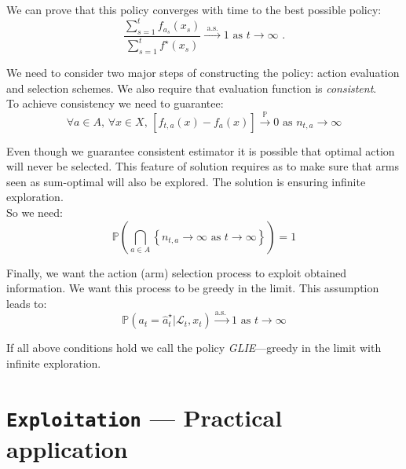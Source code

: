 \documentclass[12pt, a4paper, pdflatex, leqno]{report}
\begin{document}
We can prove that this policy converges with time to the best possible policy:
\begin{equation}
  \frac
    {\sum_{s=1}^t f_{a_s} (x_s)}
    {\sum_{s=1}^t f^\star (x_s)}
  \xrightarrow{\text{ a.s.\ }} 1 \text{ as } t \rightarrow \infty \text{ .}
\end{equation}



We need to consider two major steps of constructing the policy: action evaluation and selection schemes. We also require that evaluation function is \emph{consistent}.\\

To achieve consistency we need to guarantee:
$$
  \forall a \in A \text{, } \forall x \in X \text{, } \left[ \hat{f}_{t, a}(x) - f_a(x) \right] \xrightarrow{\mathbb{P}} 0 \text{ as } n_{t,a} \rightarrow \infty
$$

Even though we guarantee consistent estimator it is possible that optimal action will never be selected. This feature of solution requires as to make sure that arms seen as sum-optimal will also be explored. The solution is ensuring infinite exploration.\\

So we need:
$$
  \mathbb{P} \left( \bigcap_{a \in A} \left\{ n_{t,a} \rightarrow \infty \text{ as } t \rightarrow \infty \right\} \right) = 1
$$

Finally, we want the action (arm) selection process to exploit obtained information. We want this process to be greedy in the limit. This assumption leads to:\\
$$
  \mathbb{P} \left( a_t = \hat{a}_t^\star | \mathscr{L}_t, x_t \right) \xrightarrow{\text{a.s.\ }} 1 \text{ as } t \rightarrow \infty
$$

If all above conditions hold we call the policy \emph{GLIE}---greedy in the limit with infinite exploration.\\














\chapter{\texttt{\textbf{Exploitation}} --- Practical application}
\end{document}
